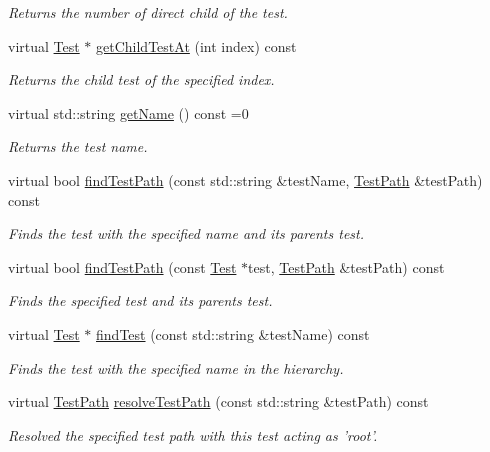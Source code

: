 \begin{DoxyCompactItemize}
\begin{DoxyCompactList}\small\item\em Returns the number of direct child of the test. \end{DoxyCompactList}\item 
virtual \hyperlink{class_test}{Test} $\ast$ \hyperlink{class_test_aad295af3b440fdec4bd95ddd422466b8}{get\-Child\-Test\-At} (int index) const 
\begin{DoxyCompactList}\small\item\em Returns the child test of the specified index. \end{DoxyCompactList}\item 
virtual std\-::string \hyperlink{class_test_a5e024da199f811a33264e432c21dcc94}{get\-Name} () const =0
\begin{DoxyCompactList}\small\item\em Returns the test name. \end{DoxyCompactList}\item 
virtual bool \hyperlink{class_test_a609b4d93fde2f4fa5b4177c1e1a002ff}{find\-Test\-Path} (const std\-::string \&test\-Name, \hyperlink{class_test_path}{Test\-Path} \&test\-Path) const 
\begin{DoxyCompactList}\small\item\em Finds the test with the specified name and its parents test. \end{DoxyCompactList}\item 
virtual bool \hyperlink{class_test_a9f0c1e40c1378f596bd5effd3a034652}{find\-Test\-Path} (const \hyperlink{class_test}{Test} $\ast$test, \hyperlink{class_test_path}{Test\-Path} \&test\-Path) const 
\begin{DoxyCompactList}\small\item\em Finds the specified test and its parents test. \end{DoxyCompactList}\item 
virtual \hyperlink{class_test}{Test} $\ast$ \hyperlink{class_test_a4182e55e98622e6daf5460e5c948dc82}{find\-Test} (const std\-::string \&test\-Name) const 
\begin{DoxyCompactList}\small\item\em Finds the test with the specified name in the hierarchy. \end{DoxyCompactList}\item 
virtual \hyperlink{class_test_path}{Test\-Path} \hyperlink{class_test_aaa1f5a8b47a9ad4feed4603c7e56758c}{resolve\-Test\-Path} (const std\-::string \&test\-Path) const 
\begin{DoxyCompactList}\small\item\em Resolved the specified test path with this test acting as 'root'. \end{DoxyCompactList}\end{DoxyCompactItemize}
